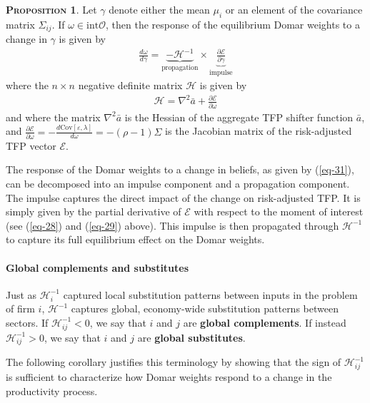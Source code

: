 \documentclass[11pt]{article}
\theoremstyle{definition}
\newtheorem{prop}{\noindent \textbf{\textsc{Proposition}}}
\begin{document}
	\begin{prop}
		Let $\gamma$ denote either the mean $\mu_i$ or an element of the covariance matrix $\Sigma_{ij}$. If $\omega \in \text{int} \mathcal{O}$, then the response of the equilibrium Domar weights to a change in $\gamma$ is given by
		\begin{align}
			\frac{d\omega}{d\gamma} = \underbrace{-\mathcal{H}^{-1}}\limits_{\text{propagation}} \times \underbrace{\frac{\partial\mathcal{E}}{\partial\gamma}}\limits_{\text{impulse}} \label{eq-31}
		\end{align}
		where the $n\times n$ negative definite matrix $\mathcal{H}$ is given by
		\begin{align}
			\mathcal{H} = \nabla^2\bar{a} + \frac{\partial\mathcal{E}}{\partial\omega} \label{eq-32}
		\end{align}
		and where the matrix $ \nabla^2\bar{a}$ is the Hessian of the aggregate TFP shifter function $\bar{a}$, and $\frac{\partial\mathcal{E}}{\partial\omega} = - \frac{d\text{Cov}[\varepsilon,\lambda]}{d\omega} = - (\rho-1)\Sigma$ is the Jacobian matrix of the risk-adjusted TFP vector $\mathcal{E}$.
	\end{prop}
	
	The response of the Domar weights to a change in beliefs, as given by (\ref{eq-31}), can be decomposed into an impulse component and a propagation component. The impulse captures the direct impact of the change on risk-adjusted TFP. It is simply given by the partial derivative of $\mathcal{E}$ with respect to the moment of interest (see (\ref{eq-28}) and (\ref{eq-29}) above). This impulse is then propagated through $\mathcal{H}^{-1}$ to capture its full equilibrium effect on the Domar weights.
	
	\paragraph{Global complements and substitutes}
	Just as $\mathcal{H}_i^{-1}$ captured local substitution patterns between inputs in the problem of firm $i$, $\mathcal{H}^{-1}$
	captures global, economy-wide substitution patterns between sectors. If $\mathcal{H}_{ij}^{-1}<0$, we say that $i$ and $j$ are \textbf{global complements}. If instead $\mathcal{H}_{ij}^{-1}>0$, we say that $i$ and $j$ are \textbf{global substitutes}.
	
	The following corollary justifies this terminology by showing that the sign of $\mathcal{H}_{ij}^{-1}$ is sufficient to characterize how Domar weights respond to a change in the productivity process.
	
\end{document}
